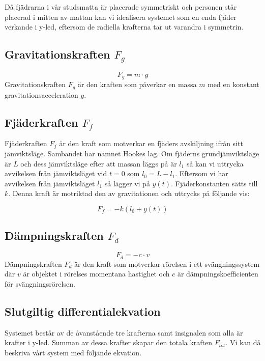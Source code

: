 \documentclass[10pt,a4paper]{article}
\begin{document}
Då fjädrarna i vår studsmatta är placerade symmetriskt och personen står placerad i mitten av mattan kan vi idealisera systemet som en enda fjäder verkande i y-led, eftersom de radiella krafterna tar ut varandra i symmetrin.

\subsection{Gravitationskraften $F_g$}

\begin{equation}
F_g = m \cdot g
\end{equation}
Gravitationskraften $F_g$ är den kraften som påverkar en massa $m$ med en konstant gravitationsacceleration $g$.

\subsection{Fjäderkraften $F_f$}

Fjäderkraften $F_f$ är den kraft som motverkar en fjäders avskiljning ifrån sitt jämviktsläge. Sambandet har namnet Hookes lag. Om fjäderns grundjämviktsläge är $L$ och dess jämviktsläge efter att massan läggs på är $l_1$ så kan vi uttrycka avvikelsen från jämviktsläget vid $t=0$ som $l_0 = L - l_1$. Eftersom vi har avvikelsen från jämviktsläget $l_1$ så lägger vi på $y(t)$. Fjäderkonstanten sätts till $k$. Denna kraft är motriktad den av gravitationen och uttrycks på följande vis:

\begin{equation}
F_f = -k (l_0 + y(t))
\end{equation}

\subsection{Dämpningskraften $F_d$}
\begin{equation}
F_d = -c \cdot v
\end{equation}
Dämpningskraften $F_d$ är den kraft som motverkar rörelsen i ett svängningssystem där $v$ är objektet i rörelses momentana hastighet och $c$ är dämpningskoefficienten för svängningsrörelsen. 

\subsection{Slutgiltig differentialekvation}

Systemet består av de åvanstående tre krafterna samt insignalen som alla är krafter i y-led. Summan av dessa krafter skapar den totala kraften $F_{tot}$. Vi kan då beskriva vårt system med följande ekvation.
\end{document}
